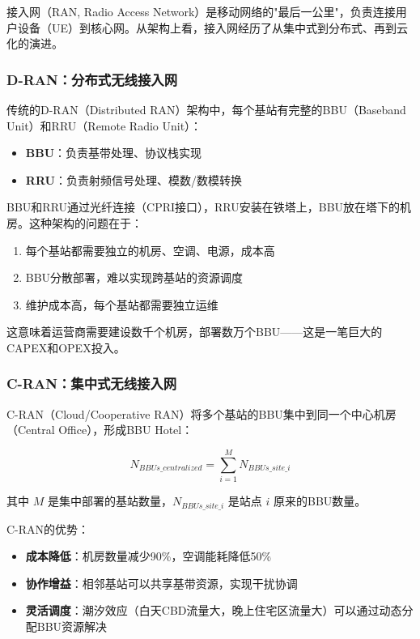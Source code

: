 接入网（RAN, Radio Access Network）是移动网络的"最后一公里"，负责连接用户设备（UE）到核心网。从架构上看，接入网经历了从集中式到分布式、再到云化的演进。

\subsubsection{D-RAN：分布式无线接入网}

传统的D-RAN（Distributed RAN）架构中，每个基站有完整的BBU（Baseband Unit）和RRU（Remote Radio Unit）：

\begin{itemize}
    \item \textbf{BBU}：负责基带处理、协议栈实现
    \item \textbf{RRU}：负责射频信号处理、模数/数模转换
\end{itemize}

BBU和RRU通过光纤连接（CPRI接口），RRU安装在铁塔上，BBU放在塔下的机房。这种架构的问题在于：

\begin{enumerate}
    \item 每个基站都需要独立的机房、空调、电源，成本高
    \item BBU分散部署，难以实现跨基站的资源调度
    \item 维护成本高，每个基站都需要独立运维
\end{enumerate}

这意味着运营商需要建设数千个机房，部署数万个BBU——这是一笔巨大的CAPEX和OPEX投入。

\subsubsection{C-RAN：集中式无线接入网}

C-RAN（Cloud/Cooperative RAN）将多个基站的BBU集中到同一个中心机房（Central Office），形成BBU Hotel：

\begin{equation}
N_{BBUs\_centralized} = \sum_{i=1}^{M} N_{BBUs\_site\_i}
\end{equation}

其中 $M$ 是集中部署的基站数量，$N_{BBUs\_site\_i}$ 是站点 $i$ 原来的BBU数量。

C-RAN的优势：
\begin{itemize}
    \item \textbf{成本降低}：机房数量减少90\%，空调能耗降低50\%
    \item \textbf{协作增益}：相邻基站可以共享基带资源，实现干扰协调
    \item \textbf{灵活调度}：潮汐效应（白天CBD流量大，晚上住宅区流量大）可以通过动态分配BBU资源解决
\end{itemize}

